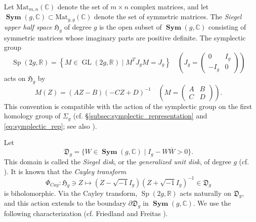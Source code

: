 \documentclass[dvipdfmx]{amsart}
\theoremstyle{remark}
\newcommand{\gl}{\mathop{GL}}
\newcommand{\spl}{\mathop{Sp}}
\newcommand{\symm}{\mathop{\mathbf{Sym}}}
\newcommand{\rank}{\mathop{rank}}
\newcommand{\mat}{\mathrm{Mat}}
\newcommand{\Cayley}{\Phi_{C\!a\!y}}
\begin{document}
Let $\mat_{m,n}(\mathbb{C})$ denote the set of $m\times n$ complex matrices, and let
$\symm(g,\mathbb{C})\subset \mat_{g,g}(\mathbb{C})$ denote the set of symmetric matrices.
The \emph{Siegel upper half space} $\mathfrak{H}_g$ of degree $g$ is the open subset of
$\symm(g,\mathbb{C})$ consisting of symmetric matrices whose imaginary parts are positive definite.
The symplectic group
\[
\spl(2g,\mathbb{R})=\left\{
M\in \gl(2g,\mathbb{R})\mid M^TJ_gM=J_g\right\}
\quad
\left(
J_g=\begin{pmatrix} 0 & I_g \\ -I_g & 0\end{pmatrix}
\right)
\]
acts on $\mathfrak{H}_g$ by
\[
M(Z)=(AZ-B)(-CZ+D)^{-1}
\quad
\left(M=\begin{pmatrix} A & B \\ C & D\end{pmatrix}\right).
\]
This convention is compatible with the action of the symplectic group on the first homology group of $\Sigma_g$
(cf. \S\ref{subsec:symplectic_representation} and \eqref{eq:symplectic_rep}; see also \cite[(6.8)]{Earle1978}).


Let
\[
\mathfrak{D}_g=\{W\in \symm(g,\mathbb{C})\mid I_g-W\overline{W}>0\}.
\]
This domain is called the \emph{Siegel disk}, or the \emph{generalized unit disk}, of degree $g$
(cf. \cite{Siegel1943}).
It is known that the \emph{Cayley transform}
\begin{equation}
\label{eq:cayray}
\Cayley\colon\mathfrak{H}_g\ni Z\mapsto (Z-\sqrt{-1}I_g)(Z+\sqrt{-1}I_g)^{-1}\in \mathfrak{D}_g
\end{equation}
is biholomorphic. Via the Cayley transform, $\spl(2g,\mathbb{R})$ acts naturally on
$\mathfrak{D}_g$, and this action extends to the boundary $\partial \mathfrak{D}_g$ in
$\symm(g,\mathbb{C})$.
We use the following characterization (cf. Friedland and Freitas \cite{FriedlandFreitas2004}).
\end{document}
